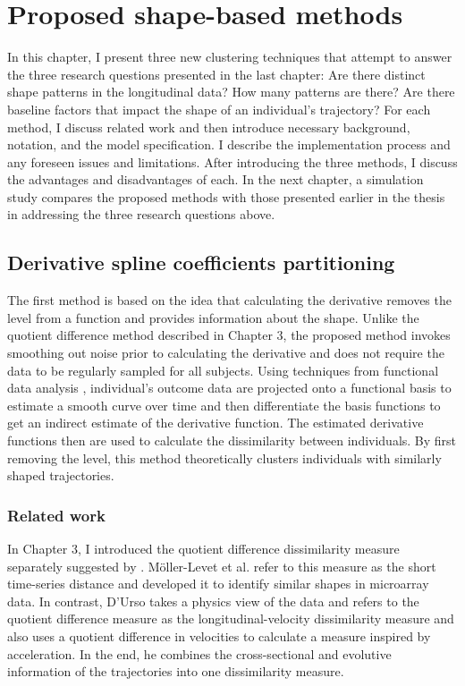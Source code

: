 \chapter{Proposed shape-based methods}
\label{chap:methods}
In this chapter, I present three new clustering techniques that attempt to answer the three research questions presented in the last chapter: Are there distinct shape patterns in the longitudinal data? How many patterns are there? Are there baseline factors that impact the shape of an individual's trajectory? For each method, I discuss related work and then introduce necessary background, notation, and the model specification. I describe the implementation process and any foreseen issues and limitations. After introducing the three methods, I discuss the advantages and disadvantages of each. In the next chapter, a simulation study compares the proposed methods with those presented earlier in the thesis in addressing the three research questions above.

\section{Derivative spline coefficients partitioning}
The first method is based on the idea that calculating the derivative removes the level from a function and provides information about the shape. Unlike the quotient difference method described in Chapter 3,  the proposed method invokes smoothing out noise prior to calculating the derivative and does not require the data to be regularly sampled for all subjects. Using techniques from functional data analysis \cite{ramsay2002}, individual's outcome data are projected onto a functional basis to estimate a smooth curve over time and then differentiate the basis functions to get an indirect estimate of the derivative function. The estimated derivative functions then are used to calculate the dissimilarity between individuals. By first removing the level, this  method theoretically clusters individuals with similarly shaped trajectories.

\subsection{Related work}
In Chapter 3, I introduced the quotient difference dissimilarity measure separately suggested by \textcite{d2000,moller2003}. M{\"o}ller-Levet et al. refer to this measure as the short time-series distance and developed it to identify similar shapes in microarray data. In contrast, D'Urso takes a physics view of the data and refers to the quotient difference measure as the longitudinal-velocity dissimilarity measure and also uses a quotient difference in velocities to calculate a measure inspired by acceleration. In the end, he combines the cross-sectional and evolutive information of the trajectories into one dissimilarity measure.

